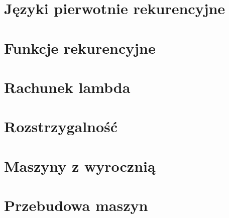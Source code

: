 \chapter{Języki pierwotnie rekurencyjne}


\chapter{Funkcje rekurencyjne}


\chapter{Rachunek lambda}


\chapter{Rozstrzygalność}


\chapter{Maszyny z wyrocznią}


\chapter{Przebudowa maszyn}
